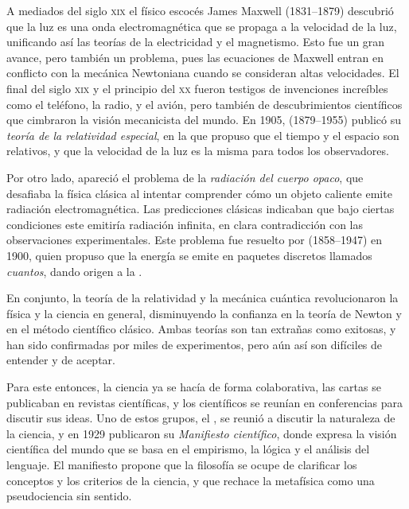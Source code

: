 A mediados del siglo \textsc{xix} el físico escocés %
{James Maxwell} (1831--1879) descubrió que la luz es una onda electromagnética
que se propaga a la velocidad de la luz, unificando así las teorías de la
electricidad y el magnetismo.
Esto fue un gran avance, pero también un problema, pues las ecuaciones de
Maxwell entran en conflicto con la mecánica Newtoniana cuando se consideran
altas velocidades.
El final del siglo \textsc{xix} y el principio del \textsc{xx} fueron testigos
de invenciones increíbles como el teléfono, la radio, y el avión, pero también
de descubrimientos científicos que cimbraron la visión mecanicista del mundo.
En 1905,  (1879--1955) publicó su
\emph{teoría de la relatividad especial}, en la que propuso que el tiempo y el
espacio son relativos, y que la velocidad de la luz es la misma para todos los
observadores.

Por otro lado, apareció el problema de la \emph{radiación del cuerpo opaco}, que
desafiaba la física clásica al intentar comprender cómo un objeto caliente emite
radiación electromagnética.
Las predicciones clásicas indicaban que bajo ciertas condiciones este emitiría
radiación infinita, en clara contradicción con las observaciones experimentales.
Este problema fue resuelto por  (1858--1947) en
1900, quien propuso que la energía se emite en paquetes discretos llamados
\emph{cuantos}, dando origen a la .

En conjunto, la teoría de la relatividad y la mecánica cuántica revolucionaron
la física y la ciencia en general, disminuyendo la confianza en la teoría de
Newton y en el método científico clásico.
Ambas teorías son tan extrañas como exitosas, y han sido confirmadas por miles
de experimentos, pero aún así son difíciles de entender y de aceptar.

Para este entonces, la ciencia ya se hacía de forma colaborativa, las cartas
se publicaban en revistas científicas, y los científicos se reunían en
conferencias para discutir sus ideas.
Uno de estos grupos, el , se
reunió a discutir la naturaleza de la ciencia, y en 1929 publicaron su
\emph{Manifiesto científico}, donde expresa la visión científica del mundo que
se basa en el empirismo, la lógica y el análisis del lenguaje.
El manifiesto propone que la filosofía se ocupe de clarificar los conceptos y
los criterios de la ciencia, y que rechace la metafísica como una pseudociencia
sin sentido.

